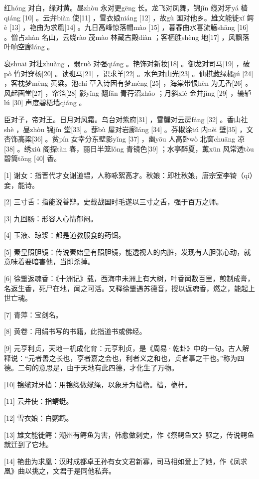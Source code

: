 \documentclass[12pt,UTF8]{ctexbook}
\begin{document}
红hóng 对白，绿对黄。昼zhòu 永对更gēng 长。龙飞对凤舞，锦jǐn 缆对牙yá 樯qiáng [10] 。云弁biàn 使[11] ，雪衣娘niáng [12] ，故gù 国对他乡。雄文能徙xǐ 鳄è [13] ，艳曲为求凰[14] 。九日高峰惊落帽mào [15] ，暮春曲水喜流觞shāng [16] 。僧占zhàn 名山，云绕rào 茂mào 林藏古殿diàn ；客栖胜shèng 地[17] ，风飘落叶响空廊láng 。

衰shuāi 对壮zhuàng ，弱ruò 对强qiáng 。艳饰对新妆[18] 。御龙对司马[19] ，破pò 竹对穿杨[20] 。读班马[21] ，识求羊[22] 。水色对山光[23] 。仙棋藏绿橘jú [24] ，客枕梦mèng 黄粱。池chí 草入诗因有梦mèng [25] ，海棠带恨hèn 为无香[26] 。风起画堂[27] ，帘箔[28] 影yǐng 翻fān 青荇沼zhǎo ；月斜xié 金井jǐng [29] ，辘轳lú [30] 声度碧梧墙qiáng 。

臣对子，帝对王。日月对风霜。乌台对紫府[31] ，雪牖对云房fáng [32] 。香山社shè ，昼zhòu 锦jǐn 堂[33] 。蔀bù 屋对岩廊láng [34] 。芬椒涂tú 内nèi 壁[35] ，文杏饰高粱[36] 。贫pín 女幸分东壁影yǐng [37] ，幽yōu 人高卧wò 北窗chuāng 凉[38] 。绣xiù 阁探tàn 春，丽日半笼lǒng 青镜色[39] ；水亭醉夏，薰xūn 风常透tòu 碧筒tǒng [40] 香。


[1] 谢女：指晋代才女谢道韫，人称咏絮高才。秋娘：即杜秋娘，唐宗室李锜（qí）妾，能诗。

[2] 三寸舌：指能说善辩。史载战国时毛遂以三寸之舌，强于百万之师。

[3] 九回肠：形容人心情郁闷。

[4] 玉液、琼浆：都是道教服食的药饵。

[5] 秦皇照胆镜：传说秦始皇有照胆镜，能透视人的内脏，发现有人胆张心动，就意味着要暗害他，当即杀掉。

[6] 徐肇返魂香：《十洲记》载，西海申未洲上有大树，叶香闻数百里，煎制成膏，名返生香，死尸在地，闻之可活。又释徐肇遇苏德音，授以返魂香，燃之，能起上世亡魂。

[7] 青萍：宝剑名。

[8] 黄卷：用绢书写的书籍，此指道书或佛经。

[9] 元亨利贞，天地一机成化育：元亨利贞，是《周易·乾卦》中的一句。古人解释说：“元者善之长也，亨者嘉之会也，利者义之和也，贞者事之干也。”称为四德。二句的意思是，由于天地有此四德，才化生了万物。

[10] 锦缆对牙樯：用锦缎做缆绳，以象牙为樯橹。樯，桅杆。

[11] 云弁使：指蜻蜓。

[12] 雪衣娘：白鹦鹉。

[13] 雄文能徙鳄：潮州有鳄鱼为害，韩愈做刺史，作《祭鳄鱼文》驱之，传说鳄鱼就迁到了它地。

[14] 艳曲为求凰：汉时成都卓王孙有女文君新寡，司马相如爱上了她，作《凤求凰》曲以挑之，文君于是同他私奔。
\end{document}
